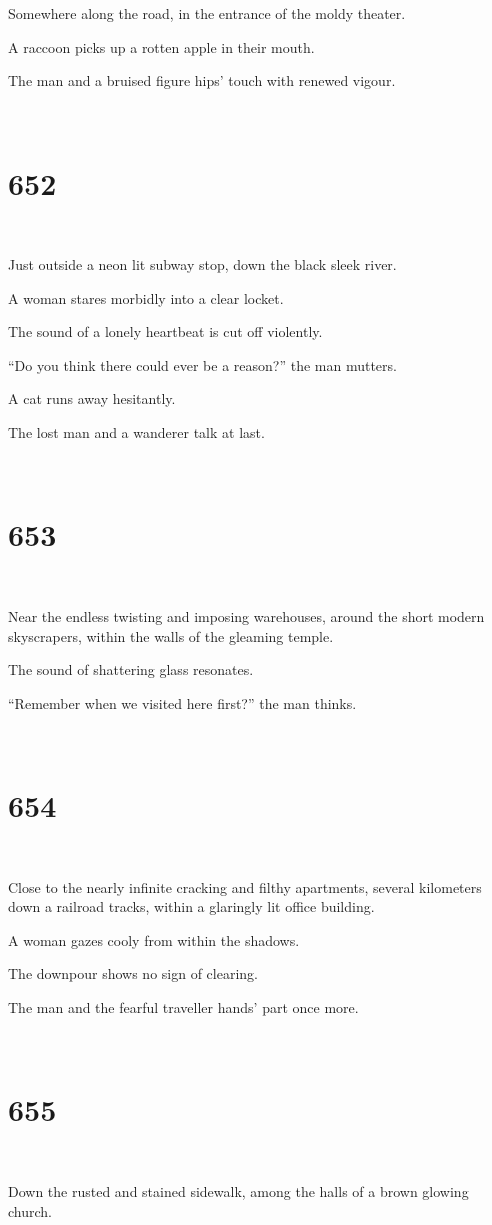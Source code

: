 \documentclass{report}
\begin{document}
Somewhere along the road, in the entrance of the moldy theater.

A raccoon picks up a rotten apple in their mouth.

The man and a bruised figure hips' touch with renewed vigour.

~
\chapter*{652}
~

Just outside a neon lit subway stop, down the black sleek river.

A woman stares morbidly into a clear locket.

The sound of a lonely heartbeat is cut off violently.

``Do you think there could ever be a reason?'' the man mutters.

A cat runs away hesitantly.

The lost man and a wanderer talk at last.

~
\chapter*{653}
~

Near the endless twisting and imposing warehouses, around the short modern skyscrapers, within the walls of the gleaming temple.

The sound of shattering glass resonates.

``Remember when we visited here first?'' the man thinks.

~
\chapter*{654}
~

Close to the nearly infinite cracking and filthy apartments, several kilometers down a railroad tracks, within a glaringly lit office building.

A woman gazes cooly from within the shadows.

The downpour shows no sign of clearing.

The man and the fearful traveller hands' part once more.

~
\chapter*{655}
~

Down the rusted and stained sidewalk, among the halls of a brown glowing church.
\end{document}
